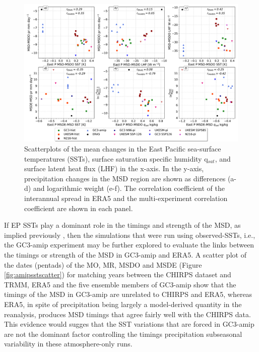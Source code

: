 \begin{figure}[t!]
\includegraphics[width=\linewidth]{figures/sstlhfpr.pdf}
\caption{Scatterplots of the mean changes in the East Pacific sea-surface temperatures (SSTs), surface saturation specific humidity q$_{sat}$, and surface latent heat flux (LHF) in the x-axis. In the y-axis, precipitation changes in the MSD region are shown as differences (a-d) and logarithmic weight (e-f). The correlation coefficient of the interannual spread in ERA5 and the multi-experiment correlation coefficient are shown in each panel.   }
\label{fig:var_sst_lhf_scatter}
\end{figure}


If EP SSTs play a dominant role in the timings and strength of the MSD, as implied previously \citep{magana1999,magana2005,herrera2015}, then the simulations that were run using observed-SSTs, i.e., the GC3-amip experiment may be further explored to evaluate the links  between the timings or strength of the MSD in GC3-amip and ERA5. A scatter plot of the dates (pentads) of the MO, MR, MSDO and MSDE (Figure \ref{fig:amipsstscatter}) for matching years between the CHIRPS dataset and TRMM, ERA5 and the five ensemble members of GC3-amip show that the timings of the MSD in GC3-amip are unrelated to CHIRPS and ERA5, whereas ERA5, in spite of precipitation being largely a model-derived quantity in the reanalysis, produces MSD timings that agree fairly well with the CHIRPS data. 
This evidence would sugges that the SST variations that are forced in GC3-amip are not the dominant factor controlling the timings precipitation subseasonal variability in these atmosphere-only runs.


